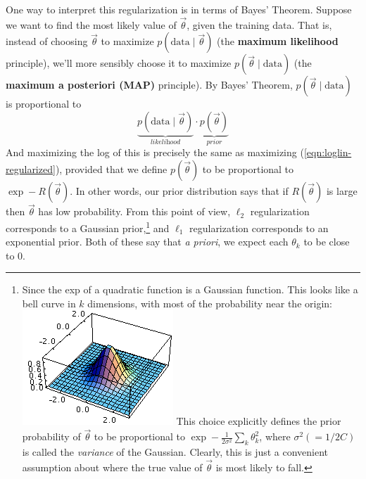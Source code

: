 \documentclass[11pt]{article}
\newcommand{\vtheta}{\vec{\theta}}
\begin{document}
One way to interpret this regularization is in terms of Bayes'
Theorem.  Suppose we want to find the most likely value of $\vtheta$,
given the training data.  That is, instead of choosing $\vtheta$ to
maximize $p(\textrm{data} \mid \vtheta)$ (the {\bf maximum likelihood}
principle), we'll more sensibly choose it to maximize $p(\vtheta \mid
\textrm{data})$ (the {\bf maximum a posteriori (MAP)} principle).  By
Bayes' Theorem, $p(\vtheta \mid \textrm{data})$ is proportional to
\begin{equation}
\underbrace{p(\textrm{data} \mid \vtheta)}_{\textit{likelihood}} \cdot \underbrace{p(\vtheta)}_{\textit{prior}} 
\end{equation}
And maximizing the log of this is precisely the same as maximizing
(\ref{eqn:loglin-regularized}), provided that we define $p(\vtheta)$
to be proportional to $\exp -R(\vtheta)$.  In other words, our prior
distribution says that if $R(\vtheta)$ is large then $\vtheta$ has low
probability.  From this point of view, $\ell_2$ regularization
corresponds to a Gaussian prior,\footnote{Since the exp of a quadratic
  function is a Gaussian function.  This looks like a bell curve in
  $k$ dimensions, with most of the probability near the
  origin: \includegraphics[scale=0.4]{gaussian} This choice explicitly defines the prior
  probability of $\vtheta$ to be proportional to $\exp -\frac{1}{2\sigma^2} \sum_k
  \theta_k^2$, where $\sigma^2 (= 1/2C)$ is called the {\em variance} of the
  Gaussian.  Clearly, this is just a convenient assumption about
  where the true value of $\vtheta$ is most likely to fall.%
}  and $\ell_1$
regularization corresponds to an exponential prior.  Both of these say
that {\em a priori}, we expect each $\theta_k$ to be close to 0.
\end{document}
